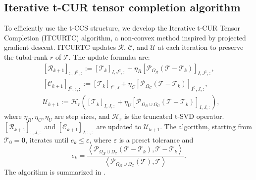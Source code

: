 \documentclass[twoside,12pt]{article}
\begin{document}
\subsection{Iterative t-CUR tensor completion algorithm}
To efficiently use the t-CCS structure, we develop the Iterative t-CUR Tensor Completion (ITCURTC) algorithm, a non-convex method inspired by projected gradient descent.  ITCURTC updates $\mathcal{R}$, $\mathcal{C}$, and $\mathcal{U}$ at each iteration to preserve the tubal-rank $r$ of $\mathcal{T}$. The update formulas are:
\begin{align}
&\left[\mathcal{R}_{k+1}\right]_{:, J^{\complement},:}  :=\left[\mathcal{T}_k\right]_{I, J^{\complement},:}+\eta_R\left[\mathcal{P}_{\Omega_\mathcal{R}}\left(\mathcal{T}-\mathcal{T}_k\right)\right]_{I, J^{\complement},:}, \label{eqn:Rcupdate}\\
&\left[\mathcal{C}_{k+1}\right]_{I^{\complement},:,: }  :=\left[\mathcal{T}_k\right]_{I^{\complement}, J}+\eta_C\left[\mathcal{P}_{\Omega_C}\left(\mathcal{T}-\mathcal{T}_k\right)\right]_{I^{\complement}, J,:}, \label{eqn:Ccupdate}\\
&\mathcal{U}_{k+1} :=\mathcal{H}_r\left(\left[\mathcal{T}_k\right]_{I, J,:}+\eta_{U}\left[\mathcal{P}_{\Omega_R \cup \Omega_C}\left(\mathcal{T}-\mathcal{T}_k\right)\right]_{I, J,:}\right), \label{eqn:Uupdate}
\end{align}
where $\eta_R, \eta_C, \eta_U$ are step sizes, and $\mathcal{H}_r$ is the truncated t-SVD operator. $\left[\mathcal{R}_{k+1}\right]_{:, J,:}$ and $\left[\mathcal{C}_{k+1}\right]_{I,:,:}$ are updated to $\mathcal{U}_{k+1}$.  The algorithm, starting from $\mathcal{T}_0=\mathbf{0}$, iterates until %
$e_k \leq \varepsilon$,
 where   $\varepsilon$ is a preset tolerance and 
 \setlength\abovedisplayskip{1pt}
\setlength\belowdisplayskip{1pt}
 \begin{equation}\label{eqn:relative error}
e_k=\frac{\left\langle\mathcal{P}_{\Omega_\mathcal{R} \cup \Omega_\mathcal{C}}\left(\mathcal{T}-\mathcal{T}_k\right),\mathcal{T}-\mathcal{T}_k\right\rangle}{\left\langle\mathcal{P}_{\Omega_{\mathcal{R}} \cup \Omega_{\mathcal{C}}}(\mathcal{T}),\mathcal{T}\right\rangle}.  
 \end{equation}
 The algorithm is summarized in . 
\end{document}
